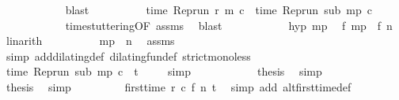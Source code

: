 \begin{isabellebody}
\ \ \ \ \ \ \ \ \ \ \isamarkupfalse%
\ blast\isanewline
\ \ \ \ \ \ \ \ \isamarkupfalse%
\ {\isacartoucheopen}time\ {\isacharparenleft}{\isacharparenleft}Rep{\isacharunderscore}run\ r{\isacharparenright}\ m\ c{\isacharparenright}\ {\isacharequal}\ time\ {\isacharparenleft}{\isacharparenleft}Rep{\isacharunderscore}run\ sub{\isacharparenright}\ m\isactrlsub p\ c{\isacharparenright}{\isacartoucheclose}\isanewline
\ \ \ \ \ \ \ \ \ \ \isamarkupfalse%
\ time{\isacharunderscore}stuttering{\isacharbrackleft}OF\ assms{\isacharbrackright}\ \isamarkupfalse%
\ blast\isanewline
\ \ \ \ \ \ \ \ \isamarkupfalse%
\ \isamarkupfalse%
\ hyp\ mp\ \isamarkupfalse%
\ {\isacartoucheopen}f\ m\isactrlsub p\ {\isacharless}\ f\ n{\isacartoucheclose}\ \isamarkupfalse%
\ linarith\isanewline
\ \ \ \ \ \ \ \ \isamarkupfalse%
\ {\isacartoucheopen}m\isactrlsub p\ {\isacharless}\ n{\isacartoucheclose}\ \isamarkupfalse%
\ assms\isanewline
\ \ \ \ \ \ \ \ \ \ \isamarkupfalse%
\ {\isacharparenleft}simp\ add{\isacharcolon}dilating{\isacharunderscore}def\ dilating{\isacharunderscore}fun{\isacharunderscore}def\ strict{\isacharunderscore}mono{\isacharunderscore}less{\isacharparenright}\isanewline
\ \ \ \ \ \ \ \ \isamarkupfalse%
\ {\isacartoucheopen}time\ {\isacharparenleft}{\isacharparenleft}Rep{\isacharunderscore}run\ sub{\isacharparenright}\ m\isactrlsub p\ c{\isacharparenright}\ {\isacharless}\ t{\isacartoucheclose}\ \isamarkupfalse%
\ {\isacharasterisk}\ \isamarkupfalse%
\ simp\isanewline
\ \ \ \ \ \ \ \ \isamarkupfalse%
\ \isamarkupfalse%
\ {\isacharquery}thesis\ \isamarkupfalse%
\ simp\isanewline
\ \ \ \ \ \ \isamarkupfalse%
\isanewline
\ \ \ \ \isacommand{{\isacharbraceright}}\isamarkupfalse%
\ \isamarkupfalse%
\ {\isacharquery}thesis\ \isamarkupfalse%
\ simp\isanewline
\ \ \isamarkupfalse%
\isanewline
\ \ \isamarkupfalse%
\ {\isacharasterisk}{\isacharasterisk}\ \isamarkupfalse%
\ {\isacartoucheopen}first{\isacharunderscore}time\ r\ c\ {\isacharparenleft}f\ n{\isacharparenright}\ t{\isacartoucheclose}\ \isamarkupfalse%
\ {\isacharparenleft}simp\ add{\isacharcolon}\ alt{\isacharunderscore}first{\isacharunderscore}time{\isacharunderscore}def{\isacharparenright}\isanewline
{}\isamarkupfalse%

\end{isabellebody}
